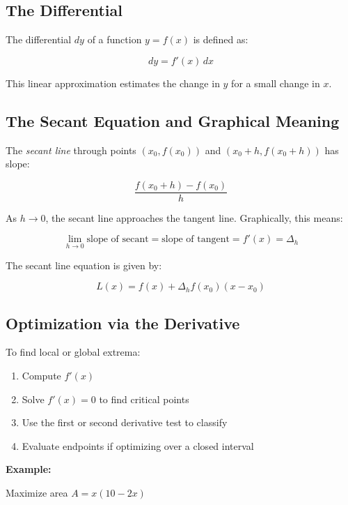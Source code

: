 \subsection{The Differential}

The differential \(dy\) of a function \(y = f(x)\) is defined as:

\[
    dy = f'(x) \, dx
\]

This linear approximation estimates the change in \(y\) for a small change in \(x\).

\subsection{The Secant Equation and Graphical Meaning}

The \emph{secant line} through points \((x_0, f(x_0))\) and \((x_0 + h, f(x_0 + h))\) has slope:

\[
    \frac{f(x_0 + h) - f(x_0)}{h}
\]

As \(h \to 0\), the secant line approaches the tangent line. Graphically, this means:

\[
    \lim_{h \to 0} \text{slope of secant} = \text{slope of tangent} = f'(x) = \Delta_h
\]

The secant line equation is given by:

\[
    L(x) = f(x) + \Delta_h f(x_0)(x - x_0)
\]

\subsection{Optimization via the Derivative}

To find local or global extrema:

\begin{enumerate}

    \item Compute \(f'(x)\)

    \item Solve \(f'(x) = 0\) to find critical points

    \item Use the first or second derivative test to classify

    \item Evaluate endpoints if optimizing over a closed interval

\end{enumerate}

\textbf{Example:}

Maximize area \(A = x(10 - 2x)\)


